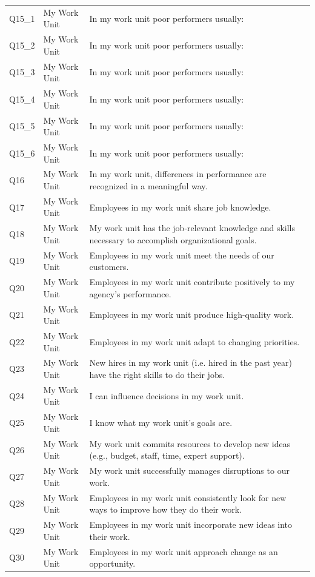 \documentclass[
  man]{apa7}
\newenvironment{lltable}{\begin{landscape}\centering\begin{ThreePartTable}}{\end{ThreePartTable}\end{landscape}}
\begin{document}
\begin{lltable}
{\begin{longtable}{lll}
Q15\_1 & My Work Unit & In my work unit poor performers usually:\\
Q15\_2 & My Work Unit & In my work unit poor performers usually:\\
Q15\_3 & My Work Unit & In my work unit poor performers usually:\\
Q15\_4 & My Work Unit & In my work unit poor performers usually:\\
Q15\_5 & My Work Unit & In my work unit poor performers usually:\\
Q15\_6 & My Work Unit & In my work unit poor performers usually:\\
Q16 & My Work Unit & In my work unit, differences in performance are recognized in a meaningful way.\\
Q17 & My Work Unit & Employees in my work unit share job knowledge.\\
Q18 & My Work Unit & My work unit has the job-relevant knowledge and skills necessary to accomplish organizational goals.\\
Q19 & My Work Unit & Employees in my work unit meet the needs of our customers.\\
Q20 & My Work Unit & Employees in my work unit contribute positively to my agency's performance.\\
Q21 & My Work Unit & Employees in my work unit produce high-quality work.\\
Q22 & My Work Unit & Employees in my work unit adapt to changing priorities.\\
Q23 & My Work Unit & New hires in my work unit (i.e. hired in the past year) have the right skills to do their jobs.\\
Q24 & My Work Unit & I can influence decisions in my work unit.\\
Q25 & My Work Unit & I know what my work unit’s goals are.\\
Q26 & My Work Unit & My work unit commits resources to develop new ideas (e.g., budget, staff, time, expert support).\\
Q27 & My Work Unit & My work unit successfully manages disruptions to our work.\\
Q28 & My Work Unit & Employees in my work unit consistently look for new ways to improve how they do their work.\\
Q29 & My Work Unit & Employees in my work unit incorporate new ideas into their work.\\
Q30 & My Work Unit & Employees in my work unit approach change as an opportunity.\\

\end{longtable}}
\end{lltable}
\end{document}
